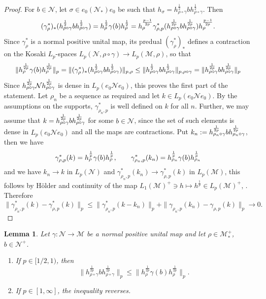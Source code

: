 \documentclass[12pt]{article}
\newtheorem{lemma}[theorem]{Lemma}
\theoremstyle{definition}
\theoremstyle{remark}
\numberwithin{equation}{section}
\def\Me{\mathcal M}
\def\Ne{\mathcal N}
\begin{document}
\begin{proof} For $b\in \Ne$, let $\sigma\in e_0 (\Ne_*)e_0$ be such that
$h_\sigma=h_{\rho\circ\gamma}^{\frac12}b h_{\rho\circ\gamma}^{\frac12}$. Then
\[
(\gamma^*_\rho)_*(h_{\rho\circ\gamma}^{\frac12}b
h_{\rho\circ\gamma}^{\frac12})=h_\rho^{\frac12}\gamma(b)h_\rho^{\frac12}=h_\rho^{p-1\over
2p}\gamma^*_{\rho,p}(h_{\rho\circ\gamma}^{1\over 2p}bh_{\rho\circ\gamma}^{1\over
2p})h_\rho^{p-1\over 2p}.
\]
Since $\gamma^*_\rho$ is a normal positive unital map, its predual $(\gamma^*_\rho)_*$
defines  a contraction on the Kosaki $L_p$-spaces  $L_p(\Ne,\rho\circ\gamma)\to L_p(\Me,\rho)$, so that 
\[
\|h_\rho^{1\over 2p}\gamma(b) h_\rho^{1\over 2p}\|_p=\|(\gamma^*_\rho)_*(h_{\rho\circ\gamma}^{\frac12}b
h_{\rho\circ\gamma}^{\frac12})\|_{p,\rho}\le \|h_{\rho\circ\gamma}^{\frac12}b
h_{\rho\circ\gamma}^{\frac12}\|_{p,\rho\circ\gamma}=\|h_{\rho\circ\gamma}^{1\over 2p}b
h_{\rho\circ\gamma}^{1\over 2p}\|_p
\]
Since $h_{\rho\circ\gamma}^{1\over 2p}\Ne h^{1\over
2p}_{\rho\circ\gamma}$ is dense in $L_p(e_0 \Ne e_0)$, this proves the first part of the
statement.  Let $\rho_n$ be a sequence as required and let $k\in L_p(e_0 \Ne e_0)$. By the
assumptions on the supports, $\gamma^*_{\rho_n,p}$ is well defined on $k$ for all $n$.
Further, we may assume that $k=h_{\rho\circ\gamma}^{1\over 2p}b
h_{\rho\circ\gamma}^{1\over 2p}$ for some $b\in \Ne$, since the set of such elements is
dense in $L_p(e_0 \Ne e_0)$ and all the maps are contractions. 
Put $k_n:=h_{\rho_n\circ\gamma}^{1\over 2p}b
h_{\rho_n\circ\gamma}^{1\over 2p}$, then we have
\[
\gamma^*_{\rho,p}(k)=h_\rho^{1\over p}\gamma(b)h_\rho^{1\over p},\qquad
\gamma^*_{\rho_n,p}(k_n)= h_{\rho_n}^{1\over p}\gamma(b)h_{\rho_n}^{1\over p}
\]
and we have $k_n\to k$ in $L_p(\Ne)$ and  $\gamma^*_{\rho_n,p}(k_n)\to
\gamma^*_{\rho,p}(k)$ in $L_p(\Me)$, this follows by H\"older and continuity of the map
$L_1(\Me)^+\ni h\mapsto h^{\frac1p}\in L_p(\Me)^+$, \cite{kosaki1986aplicationsuc}.
Therefore
\[
\|\gamma^*_{\rho_n,p}(k)-\gamma^*_{\rho,p}(k)\|_p\le
\|\gamma^*_{\rho_n,p}(k-k_n)\|_p+\|\gamma_{\rho_n,p}(k_n)-\gamma_{\rho,p}(k)\|_p\to 0.
\]


\end{proof}


\begin{lemma}\label{lemma:dpi} Let $\gamma:\Ne\to \Me$ be a normal positive unital map and
let $\rho\in \Me_*^+$, $b\in \Ne^+$. 
\begin{enumerate}
\item[(i)]  If $p\in [1/2,1)$, then 
\[
\|h_{\rho\circ\gamma}^{\frac{1}{2p}}bh_{\rho\circ\gamma}^{\frac{1}{2p}}\|_p\le
\|h_{\rho}^{\frac{1}{2p}}\gamma(b)h_{\rho}^{\frac{1}{2p}}\|_p.
\]

\item[(ii)]  If $p\in [1,\infty]$, the inequality reverses.

\end{enumerate}


\end{lemma}
\end{document}
